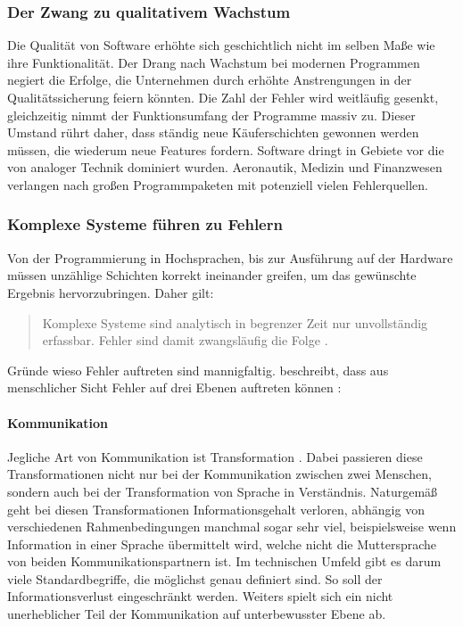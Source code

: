 \subsubsection{Der Zwang zu qualitativem Wachstum}
Die Qualität von Software erhöhte sich geschichtlich nicht im selben Maße wie ihre Funktionalität. Der Drang nach Wachstum bei modernen Programmen negiert die Erfolge, die Unternehmen durch erhöhte Anstrengungen in der Qualitätssicherung feiern könnten. Die Zahl der Fehler wird weitläufig gesenkt,  gleichzeitig nimmt der Funktionsumfang der Programme massiv zu. Dieser Umstand rührt daher, dass ständig neue Käuferschichten gewonnen werden müssen, die wiederum neue Features fordern.
Software dringt in Gebiete vor die von analoger Technik dominiert wurden. Aeronautik, Medizin und Finanzwesen verlangen nach großen Programmpaketen mit potenziell vielen Fehlerquellen.

\subsubsection{Komplexe Systeme führen zu Fehlern}
Von der Programmierung in Hochsprachen, bis zur Ausführung auf der Hardware müssen unzählige Schichten korrekt ineinander greifen, um das gewünschte Ergebnis hervorzubringen. 
Daher gilt:

\begin{quote}
Komplexe Systeme sind analytisch in begrenzer Zeit nur unvollständig erfassbar. Fehler sind damit zwangsläufig die Folge \cite{vigenschow_objektorientiertes_2004}.
\end{quote}

Gründe wieso Fehler auftreten sind mannigfaltig. \citeauthor{vigenschow_objektorientiertes_2004} beschreibt, dass aus menschlicher Sicht Fehler auf drei Ebenen auftreten können \cite{vigenschow_objektorientiertes_2004}:

\paragraph{Kommunikation}
Jegliche Art von Kommunikation ist Transformation \cite{shannon_mathematische_1976}. Dabei passieren diese Transformationen nicht nur bei der Kommunikation zwischen zwei Menschen, sondern auch bei der Transformation von Sprache in Verständnis. Naturgemäß geht bei diesen Transformationen Informationsgehalt verloren, abhängig von verschiedenen Rahmenbedingungen manchmal sogar sehr viel, beispielsweise wenn Information in einer Sprache übermittelt wird, welche nicht die Muttersprache von beiden Kommunikationspartnern ist.
Im technischen Umfeld gibt es darum viele Standardbegriffe, die möglichst genau definiert sind. So soll der Informationsverlust eingeschränkt werden.
Weiters spielt sich ein nicht unerheblicher Teil der Kommunikation auf unterbewusster Ebene ab.

